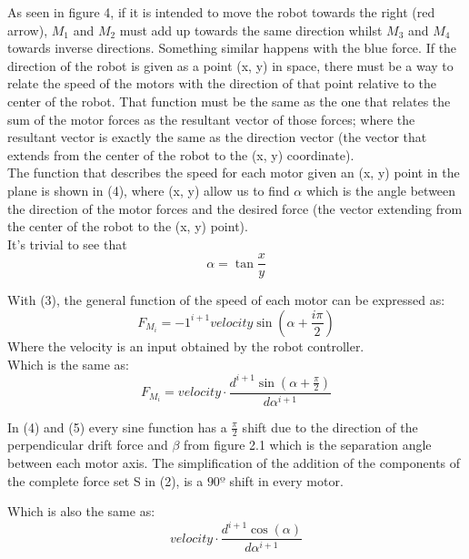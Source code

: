 \documentclass{article}
\begin{document}
\begin{multicols}{2}
As seen in figure 4, if it is intended to move the robot towards the right (red arrow), $M_{1}$ and $M_{2}$ must add up towards the same direction whilst $M_{3}$ and $M_{4}$ towards inverse directions. Something similar happens with the blue force. If the direction of the robot is given as a point (x, y) in space, there must be a way to relate the speed of the motors with the direction of that point relative to the center of the robot. That function must be the same as the one that relates the sum of the motor forces as the resultant vector of those forces; where the resultant vector is exactly the same as the direction vector (the vector that extends from the center of the robot to the (x, y) coordinate).\\

\bigskip
The function that describes the speed for each motor given an (x, y) point in the plane is shown in (4), where (x, y) allow us to find $\alpha$ which is the angle between the direction of the motor forces and the desired force (the vector extending from the center of the robot to the (x, y) point).\\

It's trivial to see that 
\begin{equation}
\alpha = \tan{\frac{x}{y}}
\end{equation}

With (3), the general function of the speed of each motor can be expressed as:
\begin{equation}
F_{M_{i}}={-1}^{i+1}velocity\sin(\alpha+\frac{i\pi}{2})
\end{equation}
Where the velocity is an input obtained by the robot controller.\\ 

Which is the same as:
\begin{equation}
F_{M_{i}} = velocity \cdot \frac{d^{i+1}\sin(\alpha + \frac{\pi}{2})}{d\alpha^{i+1}}
\end{equation}

In (4) and (5) every sine function has a $\frac{\pi}{2}$ shift due to the direction of the perpendicular drift force and $\beta$ from figure 2.1 which is the separation angle between each motor axis. The simplification of the addition of the components of the complete force set S in (2), is a $90º$ shift in every motor. 

Which is also the same as:
\begin{equation}
velocity \cdot \frac{d^{i+1}\cos(\alpha)}{d\alpha^{i+1}}
\end{equation}


\end{multicols}
\end{document}
